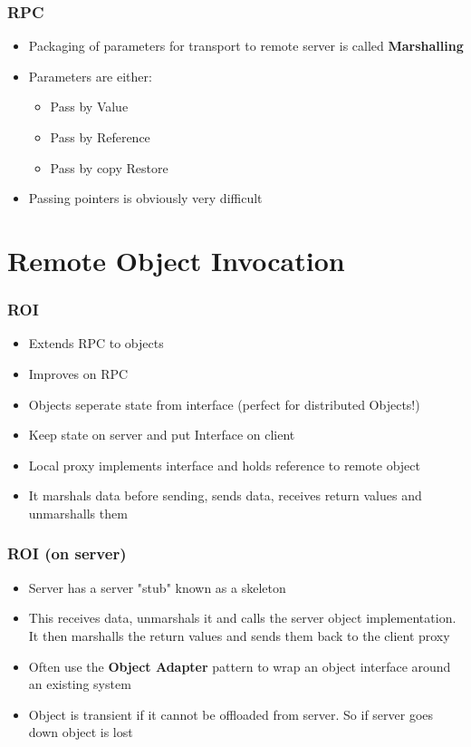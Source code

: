 \documentclass{beamer}
\begin{document}
     \begin{frame}
     	\frametitle{RPC}
     	
     	\begin{itemize}
     		\item Packaging of parameters for transport to remote server is called \textbf{Marshalling}
     		\item Parameters are either:
     		\begin{itemize}
     			\item Pass by Value
     			\item Pass by Reference
     			\item Pass by copy Restore
     		\end{itemize}
     		\item Passing pointers is obviously very difficult
     	\end{itemize}
     \end{frame}
  
\section{Remote Object Invocation}

   \begin{frame}
   	\frametitle{ROI}
   	
   	\begin{itemize}
   		\item Extends RPC to objects
   		\item Improves on RPC
   		\item Objects seperate state from interface (perfect for distributed Objects!)
   		\item Keep state on server and put Interface on client
   		\item Local proxy implements interface and holds reference to remote object
   		\item It marshals data before sending, sends data, receives return values and unmarshalls them 
   	\end{itemize}
   \end{frame}
   
      \begin{frame}
      	\frametitle{ROI (on server)}
      	
      	\begin{itemize}
      		\item Server has a server "stub" known as a skeleton
      		\item This receives data, unmarshals it and calls the server object implementation. It then marshalls the return values and sends them back to the client proxy
      		\item Often use the \textbf{Object Adapter} pattern to wrap an object interface around an existing system
      		\item Object is transient if it cannot be offloaded from server. So if server goes down object is lost
      	\end{itemize}
      \end{frame}
      
\end{document}
